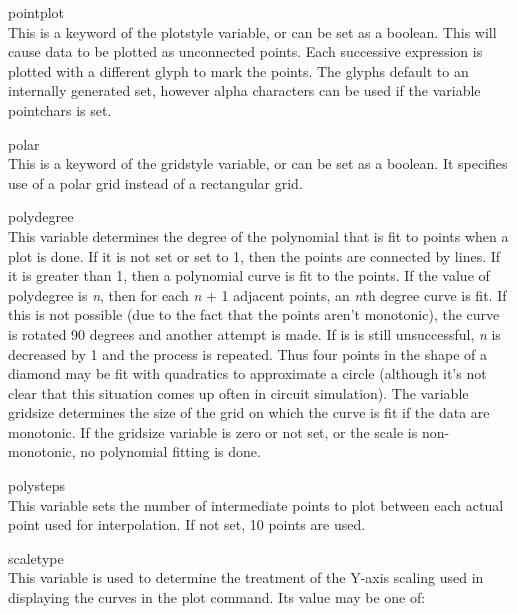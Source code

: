 \begin{description}
\item{\et pointplot}\\
This is a keyword of the {\et plotstyle} variable, or can be set as a
boolean.  This will cause data to be plotted as unconnected points. 
Each successive expression is plotted with a different glyph to mark
the points.  The glyphs default to an internally generated set,
however alpha characters can be used if the variable {\et pointchars}
is set.

\item{\et polar}\\
This is a keyword of the {\et gridstyle} variable, or can be set as a
boolean.  It specifies use of a polar grid instead of a rectangular
grid.

\item{\et polydegree}\\
This variable determines the degree of the polynomial that is fit to
points when a plot is done.  If it is not set or set to 1, then the
points are connected by lines.  If it is greater than 1, then a
polynomial curve is fit to the points.  If the value of {\et
polydegree} is {\it n\/}, then for each {\it n} + 1 adjacent points,
an {\it n\/}th degree curve is fit.  If this is not possible (due to
the fact that the points aren't monotonic), the curve is rotated 90
degrees and another attempt is made.  If is is still unsuccessful,
{\it n} is decreased by 1 and the process is repeated.  Thus four
points in the shape of a diamond may be fit with quadratics to
approximate a circle (although it's not clear that this situation
comes up often in circuit simulation).  The variable {\et gridsize}
determines the size of the grid on which the curve is fit if the data
are monotonic.  If the {\et gridsize} variable is zero or not set, or
the scale is non-monotonic, no polynomial fitting is done.

\item{\et polysteps}\\
This variable sets the number of intermediate points to plot between
each actual point used for interpolation.  If not set, 10 points are
used. 

\item{\et scaletype}\\
This variable is used to determine the treatment of the Y-axis scaling
used in displaying the curves in the {\cb plot} command.  Its value
may be one of:


\end{description}
